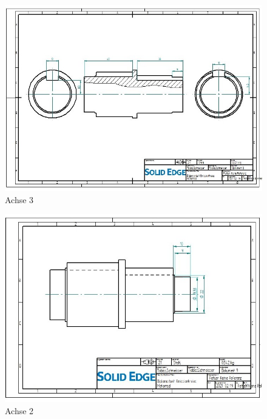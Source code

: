 \begin{figure} [H]
	\begin{center}
		\includegraphics[angle=90]{figures/mechanik/Achse_mit_nuten_Zeichnung.jpg}
			\caption{Achse 3}
			\label{fig:Achse 3}
	\end{center}
\end{figure}


\begin{figure} [H]
	\begin{center}
		\includegraphics[angle=90]{figures/mechanik/Achse_mit_nuten_20mm_Zeichnung.jpg}
			\caption{Achse 2}
			\label{fig:Achse 2}
	\end{center}
\end{figure}


